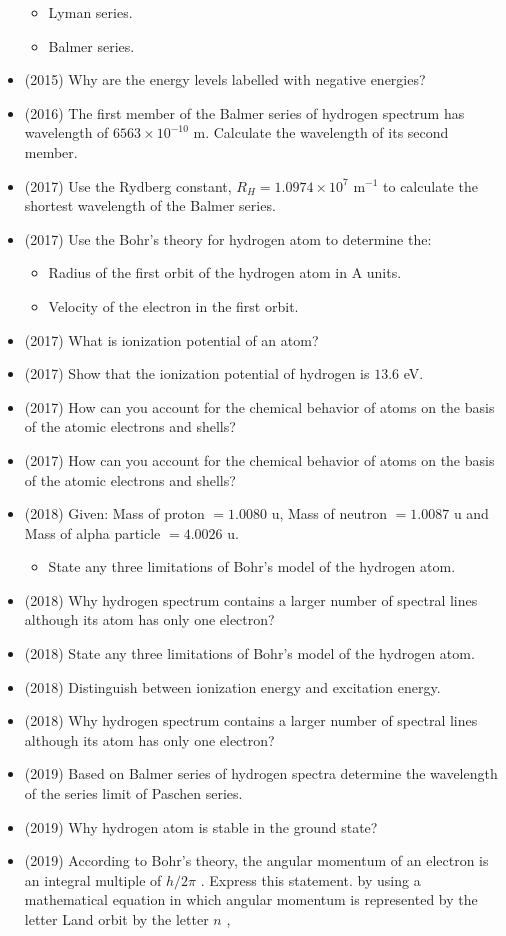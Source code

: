 \documentclass{article}
\begin{document}
\begin{itemize}
 \begin{itemize}
\item Lyman series. 
\item Balmer series. 
\end{itemize}
\item (2015)  Why are the energy levels labelled with negative energies?
\item (2016)  The first member of the Balmer series of hydrogen spectrum has wavelength of $ 6563 \times 10^{-10}$ m. Calculate the wavelength of its second member.
\item (2017)  Use the Rydberg constant, $ R_{H}=1.0974 \times 10^{7}$ m$ ^{-1}$ to calculate the shortest wavelength of the Balmer series. 
\item (2017)  Use the Bohr's theory for hydrogen atom to determine the:
 \begin{itemize}
\item Radius of the first orbit of the hydrogen atom in A units. 
\item Velocity of the electron in the first orbit. 
\end{itemize}
\item (2017)  What is ionization potential of an atom?
\item (2017)  Show that the ionization potential of hydrogen is $ 13.6$ eV. 
\item (2017)  How can you account for the chemical behavior of atoms on the basis of the atomic electrons and shells? 
\item (2017)  How can you account for the chemical behavior of atoms on the basis of the atomic electrons and shells? 
\item (2018)  Given: Mass of proton $ =1.0080$ u, Mass of neutron $ =1.0087$ u and Mass of alpha particle $ =4.0026$ u.
 \begin{itemize}
\item State any three limitations of Bohr’s model of the hydrogen atom.
\end{itemize}
\item (2018)  Why hydrogen spectrum contains a larger number of spectral lines although its  atom has only one electron? 
\item (2018)  State any three limitations of Bohr’s model of the hydrogen atom.
\item (2018)  Distinguish between ionization energy and excitation energy.
\item (2018)  Why hydrogen spectrum contains a larger number of spectral lines although its  atom has only one electron? 
\item (2019)  Based on Balmer series of hydrogen spectra determine the wavelength of the series limit of Paschen series. 
\item (2019)  Why hydrogen atom is stable in the ground state? 
\item (2019)  According to Bohr’s theory, the angular momentum of an electron is an integral multiple of $ h/2\pi$ .  Express this statement. by using a mathematical equation in which angular momentum is represented by the letter Land orbit by the letter $ n$ , 
\end{itemize}
\end{document}
